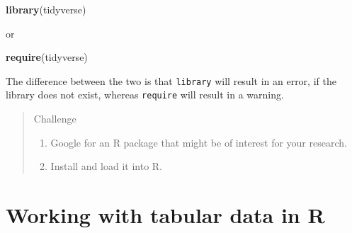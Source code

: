 \documentclass[
]{book}
\newenvironment{Shaded}{\begin{snugshade}}{\end{snugshade}}
\newcommand{\FunctionTok}[1]{\textcolor[rgb]{0.13,0.29,0.53}{\textbf{#1}}}
\newcommand{\NormalTok}[1]{#1}
\providecommand{\tightlist}{%
  \setlength{\itemsep}{0pt}\setlength{\parskip}{0pt}}
\begin{document}
\begin{Shaded}
\begin{Highlighting}[]
\FunctionTok{library}\NormalTok{(tidyverse)}
\end{Highlighting}
\end{Shaded}

or

\begin{Shaded}
\begin{Highlighting}[]
\FunctionTok{require}\NormalTok{(tidyverse)}
\end{Highlighting}
\end{Shaded}

The difference between the two is that \texttt{library} will result in an error, if the library does not exist, whereas \texttt{require} will result in a warning.

\begin{quote}
Challenge

\begin{enumerate}
\def\labelenumi{\arabic{enumi}.}
\tightlist
\item
  Google for an R package that might be of interest for your research.
\item
  Install and load it into R.
\end{enumerate}
\end{quote}

\chapter{Working with tabular data in R}\label{data}
\end{document}
